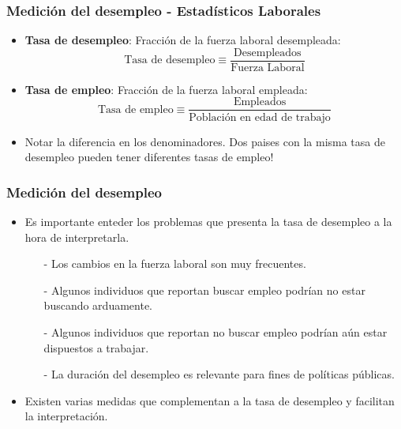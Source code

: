 \documentclass{beamer}
\begin{document}
\begin{frame}
\frametitle{Medici\'on del desempleo - Estad\'isticos Laborales}
\begin{itemize}
\setlength\itemsep{1.5em}
\item \textbf{Tasa de desempleo}: Fracci\'on de la fuerza laboral desempleada: $$\text{Tasa de desempleo} \equiv \frac{\text{Desempleados}}{\text{Fuerza Laboral}}$$
\item \textbf{Tasa de empleo}: Fracci\'on de la fuerza laboral empleada: $$\text{Tasa de empleo} \equiv \frac{\text{Empleados}}{\text{Poblaci\'on en edad de trabajo}}$$
\item Notar la diferencia en los denominadores. Dos paises con la misma tasa de desempleo pueden tener diferentes tasas de empleo!
\end{itemize}
\end{frame}


\begin{frame}
\frametitle{Medici\'on del desempleo}
\begin{itemize}
\setlength\itemsep{1.4em}
\item Es importante enteder los problemas que presenta la tasa de desempleo a la hora de interpretarla.\\
\vspace{2mm}
\begin{itemize}
\setlength\itemsep{0.9em}
\item[-] Los cambios en la fuerza laboral son muy frecuentes.
\item[-] Algunos individuos que reportan buscar empleo podr\'ian no estar buscando arduamente.
\item[-] Algunos individuos que reportan no buscar empleo podr\'ian a\'un estar dispuestos a trabajar.
\item[-] La duraci\'on del desempleo es relevante para fines de pol\'iticas p\'ublicas.
\end{itemize}
\item Existen varias medidas que complementan a la tasa de desempleo y facilitan la interpretaci\'on.
\end{itemize}
\end{frame}
\end{document}
